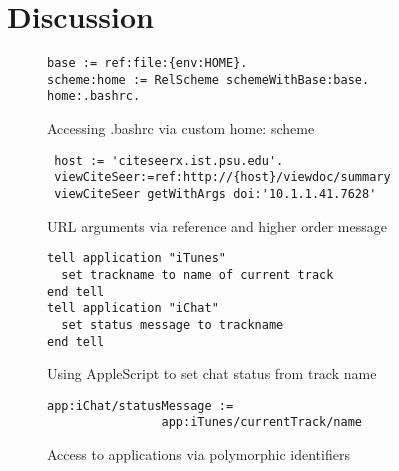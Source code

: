 \documentclass[preprint,authoryear]{acm_proc_article-sp}
\begin{document}
\section{Discussion}



\begin{figure}[htbp]
\begin{center}
\begin{verbatim}
base := ref:file:{env:HOME}.
scheme:home := RelScheme schemeWithBase:base.
home:.bashrc.
\end{verbatim}
\caption{Accessing .bashrc via custom home: scheme}
\label{rfc-scheme}
\end{center}
\end{figure}




\begin{figure}[htbp]
\begin{center}
\begin{verbatim}
 host := 'citeseerx.ist.psu.edu'.
 viewCiteSeer:=ref:http://{host}/viewdoc/summary
 viewCiteSeer getWithArgs doi:'10.1.1.41.7628'
\end{verbatim}
\caption{URL arguments via reference and higher order message}
\label{url-args}
\end{center}
\end{figure}




\begin{figure}[htbp]
\begin{center}
\begin{verbatim}
tell application "iTunes"
  set trackname to name of current track
end tell
tell application "iChat"
  set status message to trackname
end tell
\end{verbatim}
\caption{Using AppleScript to set chat status from track name}
\label{AppleScript}
\end{center}
\end{figure}


\begin{figure}[htbp]
\begin{center}
\begin{verbatim}
app:iChat/statusMessage :=
                app:iTunes/currentTrack/name
\end{verbatim}
\caption{Access to applications via polymorphic identifiers}
\label{NonAppleScript}
\end{center}
\end{figure}
\end{document}
